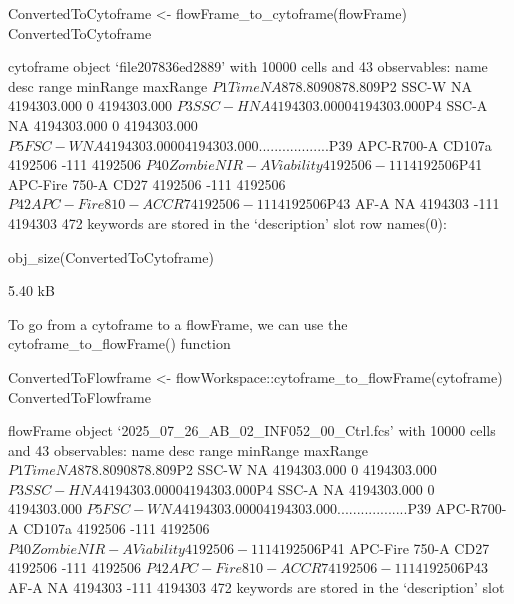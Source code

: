 \documentclass[
  letterpaper,
  DIV=11,
  numbers=noendperiod]{scrartcl}
\newenvironment{Shaded}{\begin{snugshade}}{\end{snugshade}}
\newcommand{\FunctionTok}[1]{\textcolor[rgb]{0.28,0.35,0.67}{#1}}
\newcommand{\NormalTok}[1]{\textcolor[rgb]{0.00,0.23,0.31}{#1}}
\newcommand{\OtherTok}[1]{\textcolor[rgb]{0.00,0.23,0.31}{#1}}
\newcommand{\SpecialCharTok}[1]{\textcolor[rgb]{0.37,0.37,0.37}{#1}}
\begin{document}
\begin{Shaded}
\begin{Highlighting}[]
\NormalTok{ConvertedToCytoframe }\OtherTok{\textless{}{-}} \FunctionTok{flowFrame\_to\_cytoframe}\NormalTok{(flowFrame)}
\NormalTok{ConvertedToCytoframe}
\end{Highlighting}
\end{Shaded}

cytoframe object `file207836ed2889' with 10000 cells and 43 observables:
name desc range minRange maxRange
\(P1            Time        NA     878.809         0     878.809\)P2
SSC-W NA 4194303.000 0 4194303.000
\(P3           SSC-H        NA 4194303.000         0 4194303.000\)P4
SSC-A NA 4194303.000 0 4194303.000
\(P5           FSC-W        NA 4194303.000         0 4194303.000
...             ...       ...         ...       ...         ...\)P39
APC-R700-A CD107a 4192506 -111 4192506
\(P40   Zombie NIR-A Viability     4192506      -111     4192506\)P41
APC-Fire 750-A CD27 4192506 -111 4192506
\(P42 APC-Fire 810-A      CCR7     4192506      -111     4192506\)P43
AF-A NA 4194303 -111 4194303 472 keywords are stored in the
`description' slot row names(0):

\begin{Shaded}
\begin{Highlighting}[]
\FunctionTok{obj\_size}\NormalTok{(ConvertedToCytoframe)}
\end{Highlighting}
\end{Shaded}

5.40 kB

To go from a cytoframe to a flowFrame, we can use the
cytoframe\_to\_flowFrame() function

\begin{Shaded}
\begin{Highlighting}[]
\NormalTok{ConvertedToFlowframe }\OtherTok{\textless{}{-}}\NormalTok{ flowWorkspace}\SpecialCharTok{::}\FunctionTok{cytoframe\_to\_flowFrame}\NormalTok{(cytoframe)}
\NormalTok{ConvertedToFlowframe}
\end{Highlighting}
\end{Shaded}

flowFrame object `2025\_07\_26\_AB\_02\_INF052\_00\_Ctrl.fcs' with 10000
cells and 43 observables: name desc range minRange maxRange
\(P1            Time        NA     878.809         0     878.809\)P2
SSC-W NA 4194303.000 0 4194303.000
\(P3           SSC-H        NA 4194303.000         0 4194303.000\)P4
SSC-A NA 4194303.000 0 4194303.000
\(P5           FSC-W        NA 4194303.000         0 4194303.000
...             ...       ...         ...       ...         ...\)P39
APC-R700-A CD107a 4192506 -111 4192506
\(P40   Zombie NIR-A Viability     4192506      -111     4192506\)P41
APC-Fire 750-A CD27 4192506 -111 4192506
\(P42 APC-Fire 810-A      CCR7     4192506      -111     4192506\)P43
AF-A NA 4194303 -111 4194303 472 keywords are stored in the
`description' slot
\end{document}
